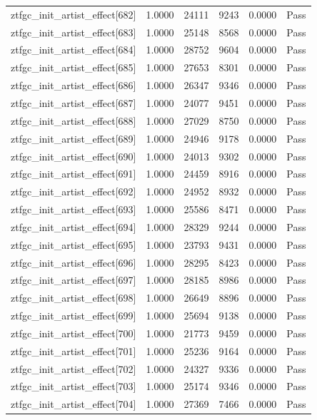 \begin{table}[htbp]
\begin{tabular}{llrrll}
ztfgc\_init\_artist\_effect[682] & 1.0000 & 24111 & 9243 & 0.0000 & Pass \\
ztfgc\_init\_artist\_effect[683] & 1.0000 & 25148 & 8568 & 0.0000 & Pass \\
ztfgc\_init\_artist\_effect[684] & 1.0000 & 28752 & 9604 & 0.0000 & Pass \\
ztfgc\_init\_artist\_effect[685] & 1.0000 & 27653 & 8301 & 0.0000 & Pass \\
ztfgc\_init\_artist\_effect[686] & 1.0000 & 26347 & 9346 & 0.0000 & Pass \\
ztfgc\_init\_artist\_effect[687] & 1.0000 & 24077 & 9451 & 0.0000 & Pass \\
ztfgc\_init\_artist\_effect[688] & 1.0000 & 27029 & 8750 & 0.0000 & Pass \\
ztfgc\_init\_artist\_effect[689] & 1.0000 & 24946 & 9178 & 0.0000 & Pass \\
ztfgc\_init\_artist\_effect[690] & 1.0000 & 24013 & 9302 & 0.0000 & Pass \\
ztfgc\_init\_artist\_effect[691] & 1.0000 & 24459 & 8916 & 0.0000 & Pass \\
ztfgc\_init\_artist\_effect[692] & 1.0000 & 24952 & 8932 & 0.0000 & Pass \\
ztfgc\_init\_artist\_effect[693] & 1.0000 & 25586 & 8471 & 0.0000 & Pass \\
ztfgc\_init\_artist\_effect[694] & 1.0000 & 28329 & 9244 & 0.0000 & Pass \\
ztfgc\_init\_artist\_effect[695] & 1.0000 & 23793 & 9431 & 0.0000 & Pass \\
ztfgc\_init\_artist\_effect[696] & 1.0000 & 28295 & 8423 & 0.0000 & Pass \\
ztfgc\_init\_artist\_effect[697] & 1.0000 & 28185 & 8986 & 0.0000 & Pass \\
ztfgc\_init\_artist\_effect[698] & 1.0000 & 26649 & 8896 & 0.0000 & Pass \\
ztfgc\_init\_artist\_effect[699] & 1.0000 & 25694 & 9138 & 0.0000 & Pass \\
ztfgc\_init\_artist\_effect[700] & 1.0000 & 21773 & 9459 & 0.0000 & Pass \\
ztfgc\_init\_artist\_effect[701] & 1.0000 & 25236 & 9164 & 0.0000 & Pass \\
ztfgc\_init\_artist\_effect[702] & 1.0000 & 24327 & 9336 & 0.0000 & Pass \\
ztfgc\_init\_artist\_effect[703] & 1.0000 & 25174 & 9346 & 0.0000 & Pass \\
ztfgc\_init\_artist\_effect[704] & 1.0000 & 27369 & 7466 & 0.0000 & Pass \\

\end{tabular}
\end{table}
